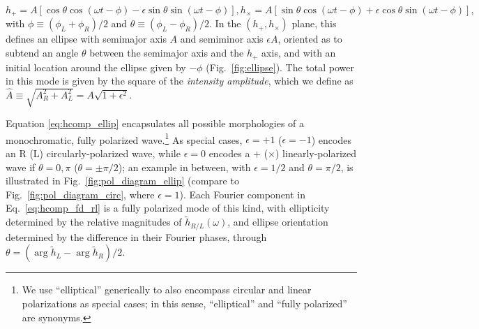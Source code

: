 \documentclass[aps,prd,twocolumn,superscriptaddress,preprintnumbers,floatfix,nofootinbib]{revtex4-2}
\newcommand{\beq}{\begin{equation}}
\newcommand{\eeq}{\end{equation}}
\begin{document}
\begin{subequations} \label{eq:hcomp_ellip}
\beq
h_+ = A \left[\cos \theta \cos(\omega t - \phi) - \epsilon \sin \theta \sin(\omega t - \phi)\right] ,
\eeq
\beq
h_\times = A \left[\sin \theta \cos(\omega t - \phi) + \epsilon \cos \theta \sin(\omega t - \phi)\right] ,
\eeq
\end{subequations}
with $\phi \equiv (\phi_L + \phi_R)/2$ and $\theta \equiv (\phi_L - \phi_R)/2$. 
In the $\left(h_+,h_\times\right)$ plane, this defines an ellipse with semimajor axis $A$ and semiminor axis $\epsilon A$, oriented as to subtend an angle $\theta$ between the semimajor axis and the $h_+$ axis, and with an initial location around the ellipse given by $-\phi$ (Fig.~\ref{fig:ellipse}).
The total power in this mode is given by the square of the \emph{intensity amplitude}, which we define as $\hat{A} \equiv \sqrt{A_R^2 + A_L^2} = A \sqrt{1 + \epsilon^2}$.

Equation \eqref{eq:hcomp_ellip} encapsulates all possible morphologies of a monochromatic, fully polarized wave.\footnote{We use ``elliptical'' generically to also encompass circular and linear polarizations as special cases; in this sense, ``elliptical'' and ``fully polarized'' are synonyms.}
As special cases, $\epsilon = +1$ ($\epsilon = -1$) encodes an R (L) circularly-polarized wave, while $\epsilon =0$ encodes a $+$ ($\times$) linearly-polarized wave if $\theta = 0,\pi$ ($\theta = \pm \pi/2$);
an example in between, with $\epsilon=1/2$ and $\theta = \pi/2$, is illustrated in Fig.~\ref{fig:pol_diagram_ellip} (compare to Fig.~\ref{fig:pol_diagram_circ}, where $\epsilon=1$).
Each Fourier component in Eq.~\eqref{eq:hcomp_fd_rl} is a fully polarized mode of this kind, with ellipticity determined by the relative magnitudes of $\tilde{h}_{R/L}(\omega)$, and ellipse orientation determined by the difference in their Fourier phases, through $\theta = (\arg \tilde{h}_L - \arg \tilde{h}_R)/2$.
\end{document}
